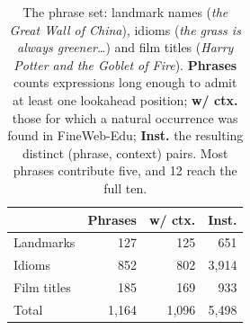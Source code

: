 \begin{table}[t]
\centering\small
\begin{tabular}{@{}lrrr@{}}
\toprule
 & \textbf{Phrases} & \textbf{w/ ctx.} & \textbf{Inst.} \\
\midrule
Landmarks & 127 & 125 & 651 \\
Idioms & 852 & 802 & 3,914 \\
Film titles & 185 & 169 & 933 \\
\midrule
Total & 1,164 & 1,096 & 5,498 \\
\bottomrule
\end{tabular}
\caption{The phrase set: landmark names (\textit{the Great Wall of China}),
idioms (\textit{the grass is always greener\ldots}) and film titles
(\textit{Harry Potter and the Goblet of Fire}). \textbf{Phrases} counts
expressions long enough to admit at least one lookahead position;
\textbf{w/ ctx.} those for which a natural occurrence was found in
FineWeb-Edu; \textbf{Inst.} the resulting distinct (phrase, context) pairs.
Most phrases contribute five, and 12 reach the
full ten.}
\label{tab:dataset}
\end{table}
